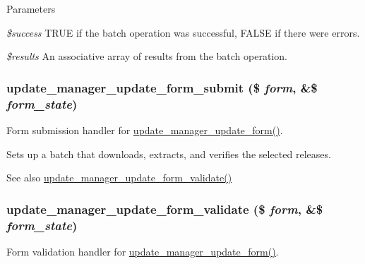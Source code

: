 \begin{DoxyParams}{Parameters}
\item[{\em \$success}]TRUE if the batch operation was successful, FALSE if there were errors. \item[{\em \$results}]An associative array of results from the batch operation. \end{DoxyParams}
\hypertarget{group__update__manager__update_gaec3a60b324711da2e658cf10d9b85447}{
\subsubsection[{update\_\-manager\_\-update\_\-form\_\-submit}]{\setlength{\rightskip}{0pt plus 5cm}update\_\-manager\_\-update\_\-form\_\-submit (\$ {\em form}, \/  \&\$ {\em form\_\-state})}}
\label{group__update__manager__update_gaec3a60b324711da2e658cf10d9b85447}
Form submission handler for \hyperlink{group__forms_ga0fa2e185b0bcbac10f995d964a199c65}{update\_\-manager\_\-update\_\-form()}.

Sets up a batch that downloads, extracts, and verifies the selected releases.

\begin{DoxySeeAlso}{See also}
\hyperlink{group__update__manager__update_ga578871dbee92e6bcb2f48ba232554c27}{update\_\-manager\_\-update\_\-form\_\-validate()} 
\end{DoxySeeAlso}
\hypertarget{group__update__manager__update_ga578871dbee92e6bcb2f48ba232554c27}{
\subsubsection[{update\_\-manager\_\-update\_\-form\_\-validate}]{\setlength{\rightskip}{0pt plus 5cm}update\_\-manager\_\-update\_\-form\_\-validate (\$ {\em form}, \/  \&\$ {\em form\_\-state})}}
\label{group__update__manager__update_ga578871dbee92e6bcb2f48ba232554c27}
Form validation handler for \hyperlink{group__forms_ga0fa2e185b0bcbac10f995d964a199c65}{update\_\-manager\_\-update\_\-form()}.

